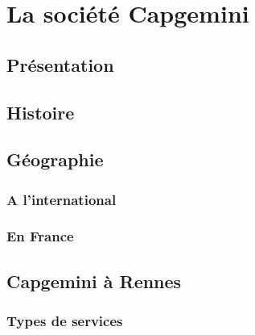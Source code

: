 \chapter{La société Capgemini}
\section{Présentation}
\section{Histoire}
\section{Géographie}
\subsection{A l'international}
\subsection{En France}
\section{Capgemini à Rennes}
\subsection{Types de services}

